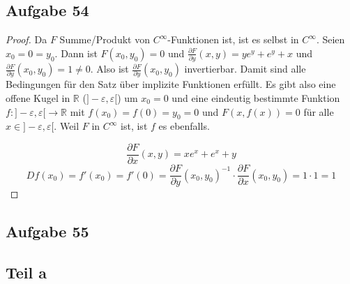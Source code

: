 \documentclass[10pt,a4paper]{article}
\begin{document}
\subsection*{Aufgabe 54}

\begin{proof}
Da $F$ Summe/Produkt von $C^{\infty}$-Funktionen ist, ist es selbst in $C^{\infty}$.
Seien $x_{0} = 0 = y_{0}$.
Dann ist $F(x_{0}, y_{0}) = 0$ und $\frac{\partial F}{\partial y}(x, y) = ye^{y} + e^{y} + x$ und $\frac{\partial F}{\partial y}(x_{0}, y_{0}) = 1 \ne 0$.
Also ist $\frac{\partial F}{\partial y}(x_{0}, y_{0})$ invertierbar.
Damit sind alle Bedingungen für den Satz über implizite Funktionen erfüllt.
Es gibt also eine offene Kugel in $\mathbb{R}$ ($]-\varepsilon, \varepsilon[$) um $x_{0} = 0$ und eine eindeutig bestimmte Funktion $f : ]-\varepsilon, \varepsilon[ \rightarrow \mathbb{R}$ mit $f(x_{0}) = f(0) = y_{0} = 0$ und $F(x, f(x)) = 0$ für alle $x \in ]-\varepsilon, \varepsilon[$.
Weil $F$ in $C^{\infty}$ ist, ist $f$ es ebenfalls.

\begin{equation}
\frac{\partial F}{\partial x}(x, y) = xe^{x} + e^{x} + y
\end{equation}
\begin{equation}
Df(x_{0}) = f'(x_{0}) = f'(0) = \frac{\partial F}{\partial y}(x_{0}, y_{0})^{-1} \cdot \frac{\partial F}{\partial x}(x_{0}, y_{0}) = 1 \cdot 1 = 1
\end{equation}
\end{proof}

\subsection*{Aufgabe 55}

\subsection*{Teil a}
\end{document}
